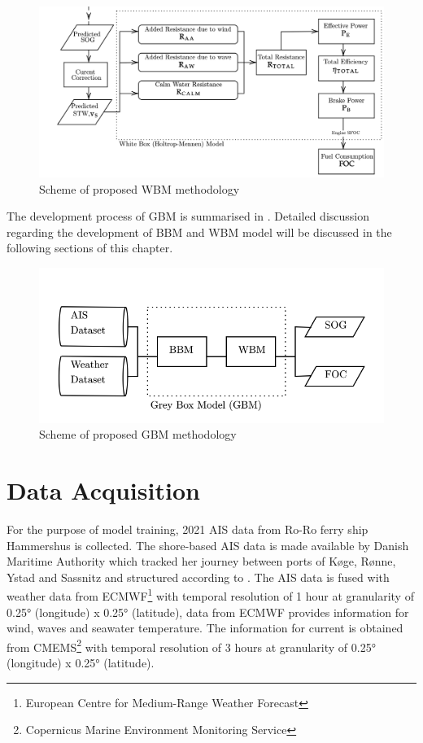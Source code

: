 \begin{figure}[h]
    \centering
        \includegraphics[width=\textwidth]{02_figures/flowmethod_WBM.png}
        \caption{Scheme of proposed WBM methodology}
        \label{fig:flowchart_WBM}
\end{figure}

The development process of GBM is summarised in . Detailed discussion regarding the development of BBM and WBM model will be discussed in the following sections of this chapter.

\begin{figure}[h]
    \centering
        \includegraphics[width=\textwidth]{02_figures/flowmethod_GBM.png}
        \caption{Scheme of proposed GBM methodology}
        \label{fig:flowchart_GBM}
\end{figure}


\section{Data Acquisition}\label{sec:data_acquisition}

For the purpose of model training, 2021 AIS data from Ro-Ro ferry ship Hammershus is collected. The shore-based AIS data is made available by Danish Maritime Authority which tracked her journey between ports of K{\o}ge, R{\o}nne, Ystad and Sassnitz and structured according to . The AIS data is fused with weather data from ECMWF\footnote{European Centre for Medium-Range Weather Forecast} with temporal resolution of 1 hour at granularity of 0.25° (longitude) x 0.25° (latitude), data from ECMWF provides information for wind, waves and seawater temperature. The information for current is obtained from CMEMS\footnote{Copernicus Marine Environment Monitoring Service} with temporal resolution of 3 hours at granularity of  0.25° (longitude) x 0.25° (latitude).\\ 

